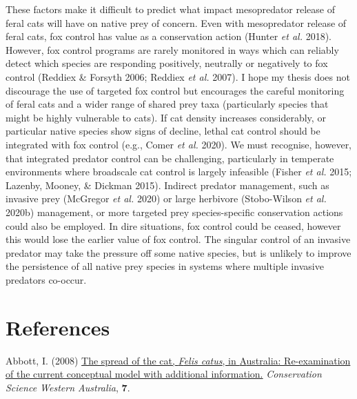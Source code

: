 \documentclass[11pt,a4paper,titlepage,twoside,openright]{style/unimelbthesis}
\newenvironment{CSLReferences}%
  {}%
  {\par}
\begin{document}
\begin{mainmatter}
These factors make it difficult to predict what impact mesopredator release of feral cats will have on native prey of concern. Even with mesopredator release of feral cats, fox control has value as a conservation action (Hunter \emph{et al.} 2018). However, fox control programs are rarely monitored in ways which can reliably detect which species are responding positively, neutrally or negatively to fox control (Reddiex \& Forsyth 2006; Reddiex \emph{et al.} 2007). I hope my thesis does not discourage the use of targeted fox control but encourages the careful monitoring of feral cats and a wider range of shared prey taxa (particularly species that might be highly vulnerable to cats). If cat density increases considerably, or particular native species show signs of decline, lethal cat control should be integrated with fox control (e.g., Comer \emph{et al.} 2020). We must recognise, however, that integrated predator control can be challenging, particularly in temperate environments where broadscale cat control is largely infeasible (Fisher \emph{et al.} 2015; Lazenby, Mooney, \& Dickman 2015). Indirect predator management, such as invasive prey (McGregor \emph{et al.} 2020) or large herbivore (Stobo-Wilson \emph{et al.} 2020b) management, or more targeted prey species-specific conservation actions could also be employed. In dire situations, fox control could be ceased, however this would lose the earlier value of fox control. The singular control of an invasive predator may take the pressure off some native species, but is unlikely to improve the persistence of all native prey species in systems where multiple invasive predators co-occur.

\hypertarget{references}{%
\chapter*{References}\label{references}}


\noindent

\setlength{\parindent}{-0.20in}
\setlength{\leftskip}{0.20in}

\hypertarget{refs}{}
\begin{CSLReferences}{1}{0}
\leavevmode{}%
Abbott, I. (2008) \href{https://www.dpaw.wa.gov.au/images/documents/about/science/cswa/articles/23.pdf}{The spread of the cat, \emph{{F}elis catus}, in {A}ustralia: Re-examination of the current conceptual model with additional information.} \emph{Conservation Science Western {A}ustralia}, \textbf{7}.


\end{CSLReferences}
\end{mainmatter}
\end{document}
